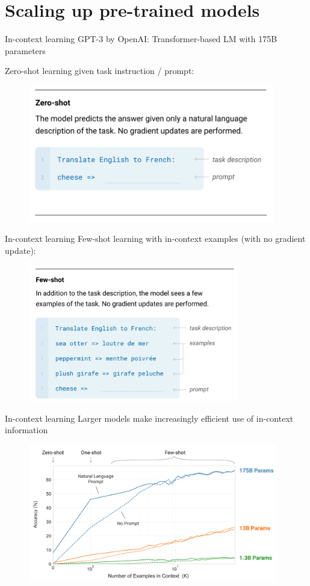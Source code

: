 \documentclass[usenames,dvipsnames,11pt,aspectratio=169]{beamer}
\begin{document}
\section{Scaling up pre-trained models}
\begin{frame}
    {In-context learning}
    GPT-3 by OpenAI: Transformer-based LM with 175B parameters

    Zero-shot learning given task instruction / prompt:
    \begin{figure}
            \includegraphics[height=6cm]{figures/in-context-zero}
    \end{figure}
\end{frame}

\begin{frame}
    {In-context learning}
    Few-shot learning with in-context examples (with no gradient update):
    \begin{figure}
            \includegraphics[height=6cm]{figures/in-context-few}
    \end{figure}
\end{frame}

\begin{frame}
    {In-context learning}
    Larger models make increasingly efficient use of in-context information
    \begin{figure}
            \includegraphics[height=6cm]{figures/scaling}
    \end{figure}
\end{frame}
\end{document}

